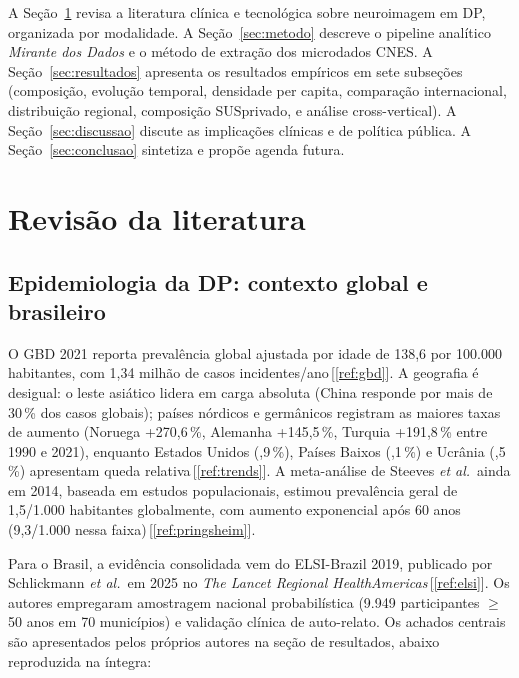 \documentclass[12pt,a4paper,oneside]{article}
\begin{document}
A Seção~\ref{sec:teoria} revisa a literatura clínica e tecnológica
sobre neuroimagem em DP, organizada por modalidade. A
Seção~\ref{sec:metodo} descreve o pipeline analítico
\textit{Mirante dos Dados} e o método de extração dos microdados
CNES. A Seção~\ref{sec:resultados} apresenta os resultados
empíricos em sete subseções (composição, evolução temporal,
densidade per capita, comparação internacional, distribuição
regional, composição SUS\textendash privado, e análise
cross-vertical). A Seção~\ref{sec:discussao} discute as implicações
clínicas e de política pública. A Seção~\ref{sec:conclusao} sintetiza
e propõe agenda futura.

\section{Revisão da literatura}\label{sec:teoria}

\subsection{Epidemiologia da DP: contexto global e brasileiro}

O GBD 2021 reporta prevalência global ajustada por idade de 138,6
por 100.000 habitantes, com 1,34 milhão de casos
incidentes/ano\,[\ref{ref:gbd}]. A geografia é desigual: o leste
asiático lidera em carga absoluta (China responde por mais de 30\,\%
dos casos globais); países nórdicos e germânicos registram as
maiores taxas de aumento (Noruega +270,6\,\%, Alemanha +145,5\,\%,
Turquia +191,8\,\% entre 1990 e 2021), enquanto Estados Unidos
(,9\,\%), Países Baixos (,1\,\%) e Ucrânia
(,5\,\%) apresentam queda relativa\,[\ref{ref:trends}].
A meta-análise de Steeves \textit{et al.}\ ainda em 2014, baseada em
estudos populacionais, estimou prevalência geral de 1,5/1.000
habitantes globalmente, com aumento exponencial após 60 anos
(9,3/1.000 nessa faixa)\,[\ref{ref:pringsheim}].

Para o Brasil, a evidência consolidada vem do ELSI-Brazil 2019,
publicado por Schlickmann \textit{et al.}\ em 2025 no \textit{The
Lancet Regional Health\textendash Americas}\,[\ref{ref:elsi}]. Os autores
empregaram amostragem nacional probabilística (9.949 participantes
$\geq$ 50 anos em 70 municípios) e validação clínica de auto-relato.
Os achados centrais são apresentados pelos próprios autores na seção
de resultados, abaixo reproduzida na íntegra:
\end{document}
